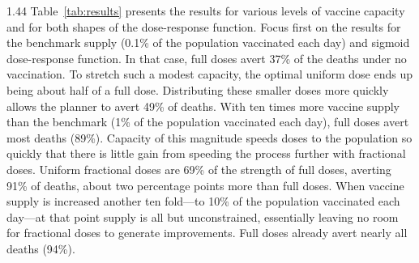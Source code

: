 \documentclass[12pt]{article}
\begin{document}
\begin{spacing}{1.44}
Table~\ref{tab:results} presents the results for various levels of
vaccine capacity and for both shapes of the dose-response
function. Focus first on the results for the benchmark supply (0.1\%
of the population vaccinated each day) and sigmoid dose-response
function. In that case, full doses avert 37\% of the deaths under no
vaccination. To stretch such a modest capacity, the optimal uniform
dose ends up being about half of a full dose. Distributing these
smaller doses more quickly allows the planner to avert 49\% of
deaths. With ten times more vaccine supply than the benchmark (1\% of
the population vaccinated each day), full doses avert most deaths
(89\%). Capacity of this magnitude speeds doses to the population so
quickly that there is little gain from speeding the process further
with fractional doses. Uniform fractional doses are 69\% of the
strength of full doses, averting 91\% of deaths, about two percentage
points more than full doses.  When vaccine supply is increased another
ten fold---to 10\% of the population vaccinated each day---at that
point supply is all but unconstrained, essentially leaving no room for
fractional doses to generate improvements. Full doses already avert
nearly all deaths (94\%).


\end{spacing}
\end{document}
